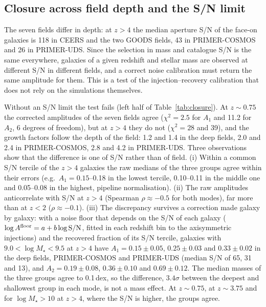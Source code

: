 \documentclass[fleqn,usenatbib]{mnras}
\newcommand{\Mstar}{M_\star}
\begin{document}
\subsection{Closure across field depth and the S/N limit}\label{sec:closure}

The seven fields differ in depth: at $z>4$ the median aperture S/N of the
face-on galaxies is 118 in CEERS and the two GOODS fields, 43 in PRIMER-COSMOS
and 26 in PRIMER-UDS. Since the selection in mass and catalogue S/N is the same
everywhere, galaxies of a given redshift and stellar mass are observed at
different S/N in different fields, and a correct noise calibration must return
the same amplitude for them. This is a test of the injection--recovery
calibration that does not rely on the simulations themselves.

Without an S/N limit the test fails (left half of Table~\ref{tab:closure}). At
$z\sim0.75$ the corrected amplitudes of the seven fields agree ($\chi^2=2.5$ for
$A_1$ and 11.2 for $A_2$, 6 degrees of freedom), but at $z>4$ they do not
($\chi^2=28$ and 39), and the growth factors follow the depth of the field: 1.2
and 1.4 in the deep fields, 2.0 and 2.4 in PRIMER-COSMOS, 2.8 and 4.2 in
PRIMER-UDS. Three observations show that the difference is one of S/N rather
than of field. (i) Within a common S/N tercile of the $z>4$ galaxies the raw
medians of the three groups agree within their errors (e.g.\ $A_1=0.15$--0.18 in
the lowest tercile, 0.10--0.11 in the middle one and 0.05--0.08 in the highest,
pipeline normalisation). (ii) The raw amplitudes anticorrelate with S/N at
$z>4$ (Spearman $\rho\approx-0.5$ for both modes), far more than at $z<2$
($\rho\approx-0.1$). (iii) The discrepancy survives a correction made galaxy by
galaxy: with a noise floor that depends on the S/N of each galaxy
($\log A^{\rm floor}=a+b\log{\rm S/N}$, fitted in each redshift bin to the
axisymmetric injections) and the recovered fraction of its S/N tercile, galaxies
with $9.0<\log\Mstar<9.5$ at $z>4$ have $A_1=0.15\pm0.05$, $0.25\pm0.03$ and
$0.33\pm0.02$ in the deep fields, PRIMER-COSMOS and PRIMER-UDS (median S/N of 65,
31 and 13), and $A_2=0.19\pm0.08$, $0.36\pm0.10$ and $0.69\pm0.12$. The median
masses of the three groups agree to 0.1\,dex, so the difference, $3.4\sigma$
between the deepest and shallowest group in each mode, is not a mass effect. At
$z\sim0.75$, at $z\sim3.75$ and for $\log\Mstar>10$ at $z>4$, where the S/N is
higher, the groups agree.
\end{document}
